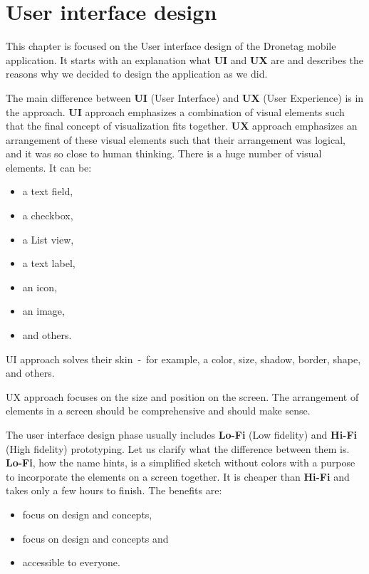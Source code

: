 \chapter{User interface design}\label{ch:user-interface-design}
This chapter is focused on the User interface design of the Dronetag mobile application.
It starts with an explanation what \textbf{UI} and \textbf{UX} are and describes the reasons why we decided to design the application as we did.

The main difference between \textbf{UI} (User Interface) and \textbf{UX} (User Experience) is in the approach.
\textbf{UI} approach emphasizes a combination of visual elements such that the final concept of visualization fits together.
\textbf{UX} approach emphasizes an arrangement of these visual elements such that their arrangement was logical, and it was so close to human thinking.
There is a huge number of visual elements.
It can be:
\begin{itemize}
    \item a text field,
    \item a checkbox,
    \item a List view,
    \item a text label,
    \item an icon,
    \item an image,
    \item and others.
\end{itemize}

UI approach solves their skin~-~for example, a color, size, shadow, border, shape, and others.

UX approach focuses on the size and position on the screen.
The arrangement of elements in a screen should be comprehensive and should make sense.

The user interface design phase usually includes \textbf{Lo-Fi} (Low fidelity) and \textbf{Hi-Fi} (High fidelity) prototyping.
Let us clarify what the difference between them is.
\textbf{Lo-Fi}, how the name hints, is a simplified sketch without colors with a purpose to incorporate the elements on a screen together.
It is cheaper than \textbf{Hi-Fi} and takes only a few hours to finish.
The benefits are:
\begin{itemize}
    \item focus on design and concepts,
    \item focus on design and concepts and
    \item accessible to everyone.\cite{hiFiLoFiPrototypeArticle}
\end{itemize}

